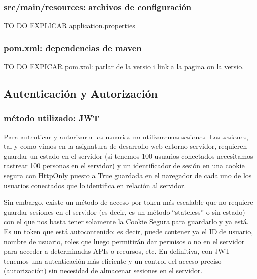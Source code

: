 \documentclass[a4paper,12pt]{report}
\begin{document}
				
				
				
				
				
				\subsubsection{src/main/resources: archivos de configuración}
				
				TO DO EXPLICAR application.properties
				
				\subsubsection{pom.xml: dependencias de maven}
				
				
				 
				
				TO DO EXPICAR pom.xml: parlar de la versio i link a la pagina on la versio.
				
				
			
				
				\subsection{Autenticación y Autorización}
				
				\subsubsection{método utilizado: JWT}
				
				Para autenticar y autorizar a los usuarios no utilizaremos sesiones. Las sesiones, tal y como vimos en la asignatura de desarrollo web entorno servidor, requieren guardar un estado en el servidor (si tenemos 100 usuarios conectados necesitamos rastrear 100 personas en el servidor) y un identificador de sesión en una cookie segura con HttpOnly puesto a True guardada en el navegador de cada uno de los usuarios conectados que lo identifica en relación al servidor.
				
				Sin embargo, existe un método de acceso por token más escalable que no requiere guardar sesiones en el servidor (es decir, es un método ``stateless'' o sin estado) con el que nos basta tener solamente la Cookie Segura para guardarlo y ya está. Es un token que está autocontenido: es decir, puede contener ya el ID de usuario, nombre de usuario, roles que luego permitirán dar permisos o no en el servidor para acceder a determinadas APIs o recursos, etc. En definitiva, con JWT tenemos una autenticación más eficiente y un control del acceso preciso (autorización) sin necesidad de almacenar sesiones en el servidor.
				
\end{document}
